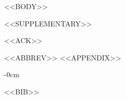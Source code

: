 \documentclass[<<DOCCLASS_OPTS>>]{Definitions/mdpi}
\begin{document}
<<BODY>>

\vspace{6pt}

<<SUPPLEMENTARY>>





<<ACK>>

<<ABBREV>>
<<APPENDIX>>
\begin{adjustwidth}{-\extralength}{0cm}


<<BIB>>

\PublishersNote{}
\end{adjustwidth}
\end{document}
